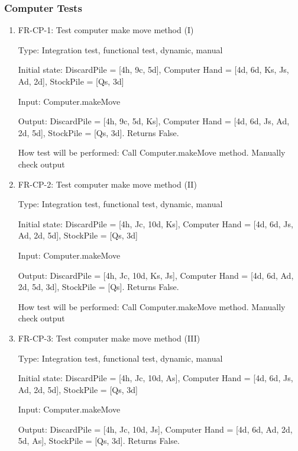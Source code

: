 \documentclass[12pt, titlepage]{article}
\begin{document}
\subsubsection{Computer Tests}
\begin{enumerate}
    \item{FR-CP-1: Test computer make move method (I)\\}
    
    Type: Integration test, functional test, dynamic, manual 
    					
    Initial state: DiscardPile = [4h, 9c, 5d], Computer Hand = [4d, 6d, Ks, Js, Ad, 2d], StockPile = [Qs, 3d]
    		
    Input: Computer.makeMove
    
    Output: DiscardPile = [4h, 9c, 5d, Ks], Computer Hand = [4d, 6d, Js, Ad, 2d, 5d], StockPile = [Qs, 3d]. Returns False.
    					
    How test will be performed: Call Computer.makeMove method. Manually check output
    
    \item{FR-CP-2: Test computer make move method (II)\\}
    
    Type: Integration test, functional test, dynamic, manual 
    					
    Initial state: DiscardPile = [4h, Jc, 10d, Ks], Computer Hand = [4d, 6d, Js, Ad, 2d, 5d], StockPile = [Qs, 3d]
    		
    Input: Computer.makeMove
    
    Output: DiscardPile = [4h, Jc, 10d, Ks, Js], Computer Hand = [4d, 6d, Ad, 2d, 5d, 3d], StockPile = [Qs]. Returns False.
    					
    How test will be performed: Call Computer.makeMove method. Manually check output
    
    \item{FR-CP-3: Test computer make move method (III)\\}
    
    Type: Integration test, functional test, dynamic, manual
    
    Initial state: DiscardPile = [4h, Jc, 10d, As], Computer Hand = [4d, 6d, Js, Ad, 2d, 5d], StockPile = [Qs, 3d]
    		
    Input: Computer.makeMove
    
    Output: DiscardPile = [4h, Jc, 10d, Js], Computer Hand = [4d, 6d, Ad, 2d, 5d, As], StockPile = [Qs, 3d]. Returns False.
    					

\end{enumerate}
\end{document}
